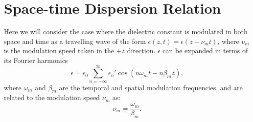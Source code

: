 \documentclass[journal]{IEEEtran}
\begin{document}
\section{Space-time Dispersion Relation}
Here we will consider the case where the dielectric constant is modulated in both space and time as a travelling wave of the form $\epsilon(z,t)=\epsilon(z-\nu_m t)$, where $\nu_m$ is the modulation speed taken in the $+z$ direction. $\epsilon$ can be expanded in terms of its Fourier harmonics
\begin{equation}
\label{eq:epsilon}
\epsilon=\epsilon_0\sum_{n=-\infty}^{\infty} \epsilon_n'\cos(n\omega_mt-n\beta_mz),
\end{equation}
where $\omega_m$ and $\beta_m$ are the temporal and spatial modulation frequencies, and are related to the modulation speed $\nu_m$ as:
\begin{equation}
\nu_m=\frac{\omega_m}{\beta_m}.
\end{equation}
\end{document}
